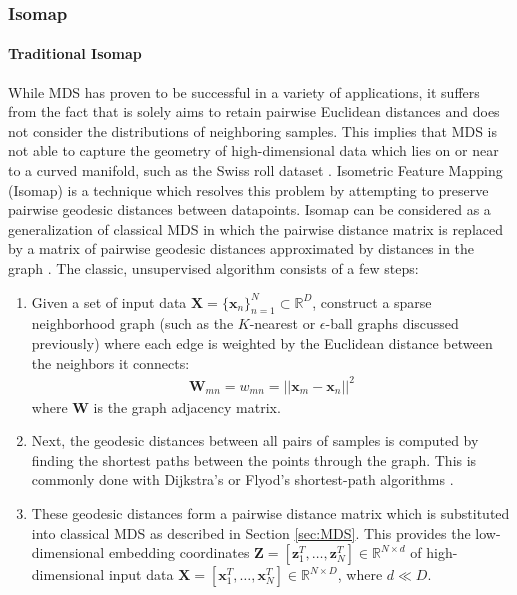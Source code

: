 \subsubsection{Isomap} \label{sec:Isomap}
\paragraph{Traditional Isomap}
While MDS has proven to be successful in a variety of applications, it suffers from the fact that is solely aims to retain pairwise Euclidean distances and does not consider the distributions of neighboring samples.  This implies that MDS is not able to capture the geometry of high-dimensional data which lies on or near to a curved manifold, such as the Swiss roll dataset \citep{VanDerMaaten2009DRReview,Chao2019RecentAdvancesSupervisedDimRed}. Isometric Feature Mapping (Isomap) \citep{Tenenbaum2000Isomap} is a technique which resolves this problem by attempting to preserve pairwise geodesic distances between datapoints.  Isomap can be considered as a generalization of classical MDS in which the pairwise distance matrix is replaced by a matrix of pairwise geodesic distances approximated by distances in the graph \citep{Thorstensen2009ManifoldThesis}.  The classic, unsupervised algorithm consists of a few steps:

\begin{enumerate}
\item Given a set of input data $\bm{X} = \{\bm{x}_{n}\}^{N}_{n=1} \subset \mathbb{R}^{D}$, construct a sparse neighborhood graph (such as the $K$-nearest  or $\epsilon$-ball graphs discussed previously) where each edge is weighted by the Euclidean distance between the neighbors it connects:
\begin{align}
	\bm{W}_{mn} = w_{mn} = ||\bm{x}_{m} - \bm{x}_{n} ||^{2} 
\end{align}
where $\bm{W}$ is the graph adjacency matrix.  

\item Next, the geodesic distances between all pairs of samples is computed by finding the shortest paths between the points through the graph.  This is commonly done with Dijkstra's or Flyod's shortest-path algorithms \citep{Tenenbaum2000Isomap}.  

\item These geodesic distances form a pairwise distance matrix which is substituted into classical MDS as described in Section \ref{sec:MDS}.  This provides the low-dimensional embedding coordinates $\bm{Z} = [\bm{z}^{T}_{1}, \dots, \bm{z}^{T}_{N}] \in \mathbb{R}^{N \times d}$ of high-dimensional input data  $\bm{X} = [\bm{x}^{T}_{1}, \dots, \bm{x}^{T}_{N}] \in \mathbb{R}^{N \times D}$, where $d \ll D$.

\end{enumerate}

